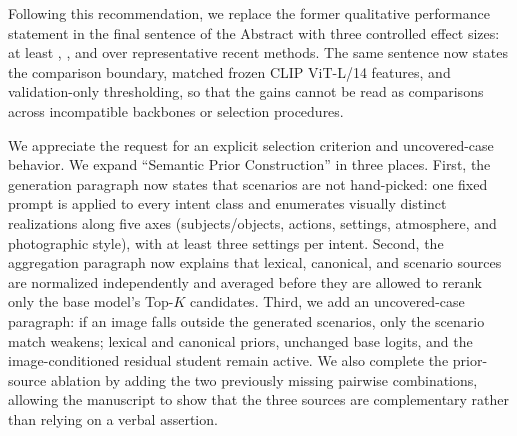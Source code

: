 
{Following this recommendation, we replace the former qualitative performance statement in the final sentence of the Abstract with three controlled effect sizes: at least , , and  over representative recent methods. The same sentence now states the comparison boundary, matched frozen CLIP ViT-L/14 features, and validation-only thresholding, so that the gains cannot be read as comparisons across incompatible backbones or selection procedures.
}
\showMainResults
\showThresholdFree

{We appreciate the request for an explicit selection criterion and uncovered-case behavior. We expand ``Semantic Prior Construction'' in three places. First, the generation paragraph now states that scenarios are not hand-picked: one fixed prompt is applied to every intent class and enumerates visually distinct realizations along five axes (subjects/objects, actions, settings, atmosphere, and photographic style), with at least three settings per intent. Second, the aggregation paragraph now explains that lexical, canonical, and scenario sources are normalized independently and averaged before they are allowed to rerank only the base model's Top-$K$ candidates. Third, we add an uncovered-case paragraph: if an image falls outside the generated scenarios, only the scenario match weakens; lexical and canonical priors, unchanged base logits, and the image-conditioned residual student remain active. We also complete the prior-source ablation by adding the two previously missing pairwise combinations, allowing the manuscript to show that the three sources are complementary rather than relying on a verbal assertion.
}
\showPriorAblation

